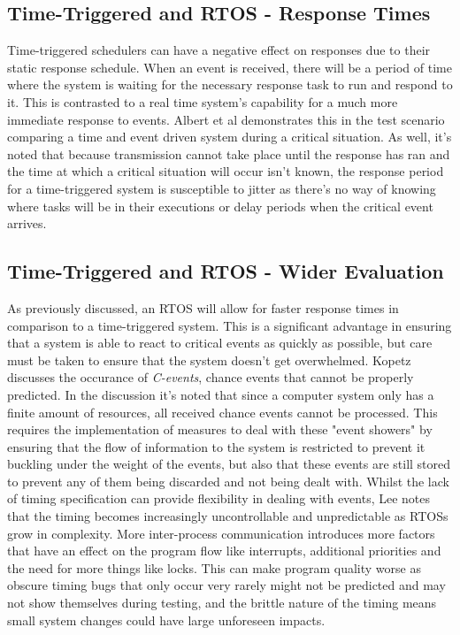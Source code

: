 \documentclass[]{report}
\begin{document}
			\subsection{Time-Triggered and RTOS - Response Times}
			Time-triggered schedulers can have a negative effect on responses due to their static response schedule. When an event is received, there will be a period of time where the system is waiting for the necessary response task to run and respond to it. This is contrasted to a real time system's capability for a much more immediate response to events. Albert et al\cite{albert2004comparison} demonstrates this in the test scenario comparing a time and event driven system during a critical situation. As well, it's noted that because transmission cannot take place until the response has ran and the time at which a critical situation will occur isn't known, the response period for a time-triggered system is susceptible to jitter as there's no way of knowing where tasks will be in their executions or delay periods when the critical event arrives.
			
			\subsection{Time-Triggered and RTOS - Wider Evaluation}
			As previously discussed, an RTOS will allow for faster response times in comparison to a time-triggered system. This is a significant advantage in ensuring that a system is able to react to critical events as quickly as possible, but care must be taken to ensure that the system doesn't get overwhelmed. Kopetz\cite{kopetz1991event} discusses the occurance of \textit{C-events}, chance events that cannot be properly predicted. In the discussion it's noted that since a computer system only has a finite amount of resources, all received chance events cannot be processed. This requires the implementation of measures to deal with these "event showers" by ensuring that the flow of information to the system is restricted to prevent it buckling under the weight of the events, but also that these events are still stored to prevent any of them being discarded and not being dealt with. Whilst the lack of timing specification can provide flexibility in dealing with events, Lee\cite{Lee:EECS-2009-30} notes that the timing becomes increasingly uncontrollable and unpredictable as RTOSs grow in complexity. More inter-process communication introduces more factors that have an effect on the program flow like interrupts, additional priorities and the need for more things like locks. This can make program quality worse as obscure timing bugs that only occur very rarely might not be predicted and may not show themselves during testing, and the brittle nature of the timing means small system changes could have large unforeseen impacts.
			
\end{document}
